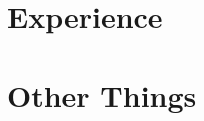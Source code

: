 \documentclass[letterpaper]{twentysecondcv} %
\begin{document}
\makeprofile %


\section{Experience}

\begin{twenty} %
\end{twenty}

\section{Other Things}
\end{document}
